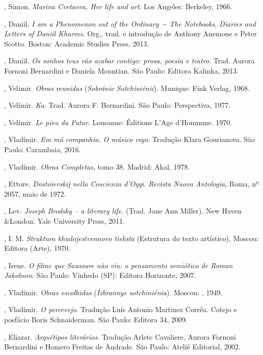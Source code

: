 , Simon. \emph{Marina Cvetaeva, Her life and art}. Los Angeles: Berkeley, 1966.

, Daniil. \emph{I am a Phenomenon out of the Ordinary − The
Notebooks, Diaries and Letters of Daniil Kharms.} Org., trad. e introdução de Anthony Anemone e Peter Scotto. Boston: Academic Studies Press, 2013.

, Daniil. \emph{Os sonhos teus vão acabar contigo: prosa, poesia e teatro}. Trad. Aurora Fornoni Bernardini e Daniela Mountian. São Paulo: Editora Kalinka, 2013.

, Velimir. \emph{Obras reunidas} (\emph{Sobránie Sotchiniénii}). Munique: Fink Verlag, 1968.

, Velímir. \emph{Ka}. Trad. Aurora F. Bernardini. São Paulo:
Perspectiva, 1977.

, Velímir. \emph{Le pieu du Futur}. Lousanne: Éditions L'Age
d'Hommme. 1970.

, Vladímir. \emph{Em má companhia. O músico cego}. Tradução Klara Gourianova. São Paulo: Carambaia, 2016.

, Vladímir. \emph{Obras Completas}, tomo 38. Madrid: Akal, 1978.

, Ettore. \emph{Dostoievskij nella Coscienza d'Oggi}. \emph{Revista Nuova Antologia}, Roma, nº 2057, maio de 1972.

, Lev. \emph{Joseph Brodsky -- a literary life.} (Trad. Jane Ann
Miller). New Haven \&London: Yale University Press, 2011.

, I. M. \emph{Struktura khudojestvennovo tieksta} (Estrutura do
texto artístico), Moscou: Editora (Arte), 1970.

, Irene. \emph{O filme que Saussure não viu: o pensamento
semiótico de Roman Jakobson}. São Paulo: Vinhedo (SP): Editora
Horizonte, 2007.

, Vladímir. \emph{Obras escolhidas} (\emph{Ízbrannye sotchiniénia}). Moscou: , 1949.

, Vladímir. \emph{O percevejo}. Tradução Luís Antonio Martinez Corrêa. Cotejo e posfácio Boris Schnaiderman. São Paulo: Editora 34, 2009.

, Eliazar. \emph{Arquétipos literários}. Tradução Arlete Cavaliere, Aurora Fornoni Bernardini e Homero Freitas de Andrade. São Paulo: Ateliê Editorial, 2002. 

